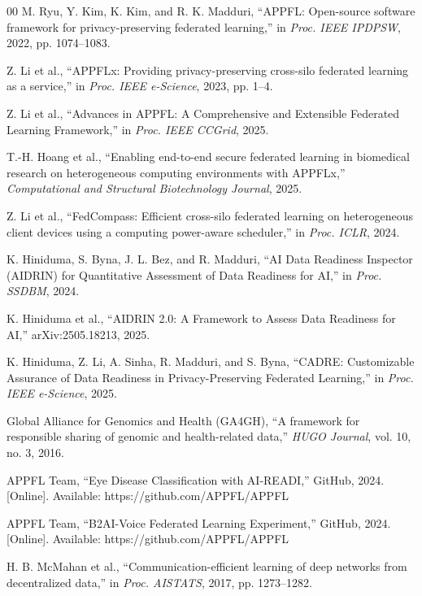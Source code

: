 \documentclass[conference]{IEEEtran}
\begin{document}
\begin{thebibliography}{00}
M. Ryu, Y. Kim, K. Kim, and R. K. Madduri, ``APPFL: Open-source software framework for privacy-preserving federated learning,'' in \emph{Proc. IEEE IPDPSW}, 2022, pp. 1074--1083.

Z. Li et al., ``APPFLx: Providing privacy-preserving cross-silo federated learning as a service,'' in \emph{Proc. IEEE e-Science}, 2023, pp. 1--4.

Z. Li et al., ``Advances in APPFL: A Comprehensive and Extensible Federated Learning Framework,'' in \emph{Proc. IEEE CCGrid}, 2025.

T.-H. Hoang et al., ``Enabling end-to-end secure federated learning in biomedical research on heterogeneous computing environments with APPFLx,'' \emph{Computational and Structural Biotechnology Journal}, 2025.

Z. Li et al., ``FedCompass: Efficient cross-silo federated learning on heterogeneous client devices using a computing power-aware scheduler,'' in \emph{Proc. ICLR}, 2024.

K. Hiniduma, S. Byna, J. L. Bez, and R. Madduri, ``AI Data Readiness Inspector (AIDRIN) for Quantitative Assessment of Data Readiness for AI,'' in \emph{Proc. SSDBM}, 2024.

K. Hiniduma et al., ``AIDRIN 2.0: A Framework to Assess Data Readiness for AI,'' arXiv:2505.18213, 2025.

K. Hiniduma, Z. Li, A. Sinha, R. Madduri, and S. Byna, ``CADRE: Customizable Assurance of Data Readiness in Privacy-Preserving Federated Learning,'' in \emph{Proc. IEEE e-Science}, 2025.

Global Alliance for Genomics and Health (GA4GH), ``A framework for responsible sharing of genomic and health-related data,'' \emph{HUGO Journal}, vol. 10, no. 3, 2016.

APPFL Team, ``Eye Disease Classification with AI-READI,'' GitHub, 2024. [Online]. Available: https://github.com/APPFL/APPFL

APPFL Team, ``B2AI-Voice Federated Learning Experiment,'' GitHub, 2024. [Online]. Available: https://github.com/APPFL/APPFL

H. B. McMahan et al., ``Communication-efficient learning of deep networks from decentralized data,'' in \emph{Proc. AISTATS}, 2017, pp. 1273--1282.


\end{thebibliography}
\end{document}
